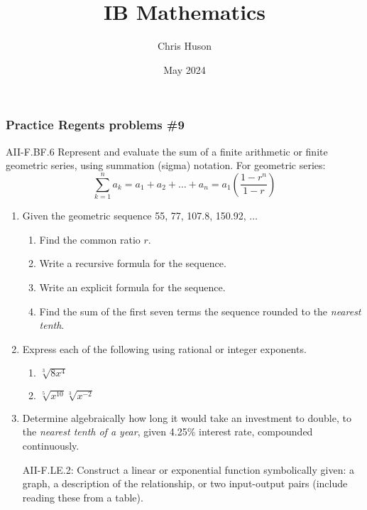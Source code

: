 \documentclass[12pt, twoside]{article}
\title{IB Mathematics}
\author{Chris Huson}
\date{May 2024}
\begin{document}
\subsubsection*{Practice Regents problems \#9}
AII-F.BF.6 Represent and evaluate the sum of a finite arithmetic
or finite geometric series, using summation (sigma) notation. For geometric series:
$$\sum_{k=1}^{n} a_k = a_1 + a_2 + \ldots + a_n = a_1 \left( \frac{1-r^n}{1-r} \right)$$

\begin{enumerate}
\item Given the geometric sequence 55, 77, 107.8, 150.92, $\ldots$
\begin{enumerate}[itemsep=2cm]
    \item Find the common ratio $r$.
    \item Write a recursive formula for the sequence.
    \item Write an explicit formula for the sequence.
    \item Find the sum of the first seven terms the sequence rounded to the \emph{nearest tenth}.
\end{enumerate} \vspace{3cm}

\item Express each of the following using rational or integer exponents. 
\begin{multicols}{2}
    \begin{enumerate}
        \item $\sqrt[3]{8x^4}$
        \item $\sqrt[5]{x^{10}}\sqrt[3]{x^{-2}}$
    \end{enumerate}
\end{multicols}
\vspace{3cm}

\newpage
\item Determine algebraically how long it would take an investment to double, to the \emph{nearest tenth of a year}, given 4.25\% interest rate, compounded continuously.

\newpage
AII-F.LE.2: Construct a linear or exponential function symbolically given: a graph, a description of the relationship, or two input-output pairs (include reading these from a table).


\end{enumerate}
\end{document}
